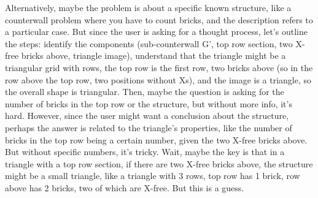 Alternatively, maybe the problem is about a specific known structure, like a counterwall problem where you have to count bricks, and the description refers to a particular case. But since the user is asking for a thought process, let's outline the steps: identify the components (sub-counterwall G', top row section, two X-free bricks above, triangle image), understand that the triangle might be a triangular grid with rows, the top row is the first row, two bricks above (so in the row above the top row, two positions without Xs), and the image is a triangle, so the overall shape is triangular. Then, maybe the question is asking for the number of bricks in the top row or the structure, but without more info, it's hard. However, since the user might want a conclusion about the structure, perhaps the answer is related to the triangle's properties, like the number of bricks in the top row being a certain number, given the two X-free bricks above. But without specific numbers, it's tricky. Wait, maybe the key is that in a triangle with a top row section, if there are two X-free bricks above, the structure might be a small triangle, like a triangle with 3 rows, top row has 1 brick, row above has 2 bricks, two of which are X-free. But this is a guess.

